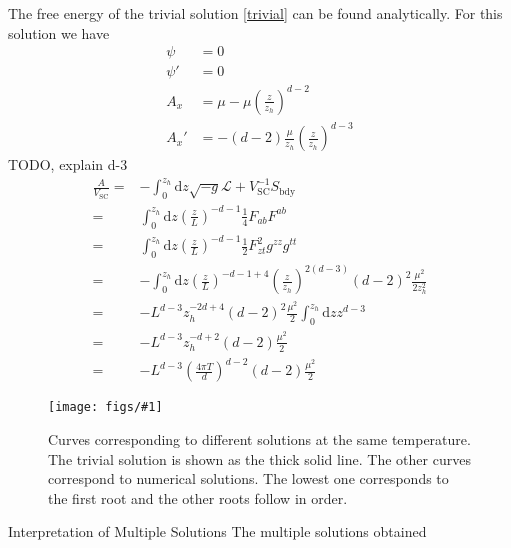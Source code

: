 \documentclass[12pt]{report}
\renewcommand{\d}{\ensuremath{\mathrm{d}}}
\renewcommand{\L}{\ensuremath{\mathcal{L}}}
\newcommand{\At}{\ensuremath{{A_x}}}
\newcommand{\fig}[3]{
\begin{figure}
\centering
\texttt{[image: figs/\#1]}
\caption{#2}
\end{figure}
}
\begin{document}
The free energy of the trivial solution \eqref{trivial} can be found analytically. For this solution we have
\begin{equation}
 \begin{split}
  \psi&=0\\
  \psi'&=0\\
  \At&=\mu-\mu\left(\frac{z}{z_h}\right)^{d-2}\\
  \At'&=-(d-2)\frac{\mu}{z_h}\left(\frac{z}{z_h}\right)^{d-3}
 \end{split}
\end{equation}TODO, explain d-3
\begin{equation}
\begin{split}
 \frac{A}{V_\mathrm{SC}}=&-\int_0^{z_h}\d z \sqrt{-g}\L+V_\mathrm{SC}^{-1}S_{\mathrm{bdy}}\\
=&\int_0^{z_h}\d z \left(\frac{z}{L}\right)^{-d-1}\frac{1}{4}F_{ab}F^{ab}\\
=&\int_0^{z_h}\d z \left(\frac{z}{L}\right)^{-d-1}\frac{1}{2}F_{zt}^2g^{zz}g^{tt}\\
=&-\int_0^{z_h}\d z \left(\frac{z}{L}\right)^{-d-1+4}\left(\frac{z}{z_h}\right)^{2(d-3)}(d-2)^2\frac{\mu^2}{2z_h^2}\\
=&-L^{d-3}z_h^{-2d+4}(d-2)^2\frac{\mu^2}{2} \int_0^{z_h}\d z z^{d-3}\\
=&-L^{d-3}z_h^{-d+2}(d-2)\frac{\mu^2}{2}\\
=&-L^{d-3}\left(\frac{4\pi T}{d}\right)^{d-2}(d-2)\frac{\mu^2}{2}
\end{split}
\end{equation}
\fig{A}{Curves corresponding to different solutions at the same temperature. The trivial solution is shown as the thick solid line. The other curves correspond to numerical solutions. The lowest one corresponds to the first root and the other roots follow in order.\label{f:A}}
\subsection{Interpretation of Multiple Solutions}
The multiple solutions obtained 
\end{document}

